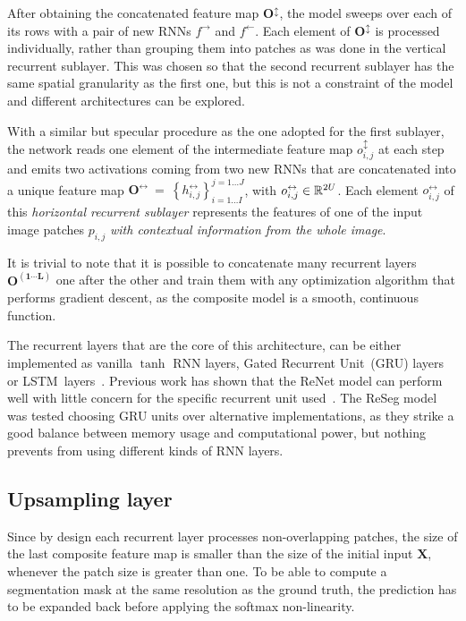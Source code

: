 After obtaining the concatenated feature map $\mathbf{O^{\updownarrow}}$, the
model sweeps over each of its rows with a pair of new RNNs $f^{\rightarrow}$
and $f^{\leftarrow}$. Each element of $\mathbf{O^{\updownarrow}}$ is processed
individually, rather than grouping them into patches as was done in the
vertical recurrent sublayer. This was chosen so that the second recurrent
sublayer has the same spatial granularity as the first one, but this is not a
constraint of the model and different architectures can be explored.

With a similar but specular procedure as the one adopted for the first
sublayer, the network reads one element of the intermediate feature map
$o^\updownarrow_{i,j}$ at each step and emits two activations coming from two
new RNNs that are concatenated into a unique feature map
$\mathbf{O^\leftrightarrow}~=~\left\{ h^\leftrightarrow_{i,j} \right\}
_{i=1\dots I}^{j=1\dots J}$, with $o^\leftrightarrow_{i,j} \in
\mathbb{R}^{2U}$. Each element $o^\leftrightarrow_{i,j}$ of this \emph{horizontal
recurrent sublayer} represents the features of one of the input image patches
$p_{i,j}$ \emph{with contextual information from the whole image}.

It is trivial to note that it is possible to concatenate many recurrent layers
$\mathbf{O^{(1 \cdots L)}}$ one after the other and train them with any
optimization algorithm that performs gradient descent, as the composite model
is a smooth, continuous function.

The recurrent layers that are the core of this architecture, can be either
implemented as vanilla $\tanh$ RNN layers, Gated Recurrent Unit~(GRU)
layers~\cite{Cho2014} or LSTM~layers~\cite{Hochreiter+Schmidhuber-1997}.
Previous work has shown that the ReNet model can perform well with little
concern for the specific recurrent unit used~\cite{visin2015renet}. The ReSeg
model was tested choosing GRU units over alternative implementations, as
they strike a good balance between memory usage and computational power, but
nothing prevents from using different kinds of RNN layers.

\subsection{Upsampling layer}\label{sec:upsampling}

Since by design each recurrent layer processes non-overlapping patches, the
size of the last composite feature map is smaller than the size of the
initial input $\mathbf{X}$, whenever the patch size is greater than one. To be
able to compute a segmentation mask at the same resolution as the ground truth,
the prediction has to be expanded back before applying the softmax
non-linearity.

